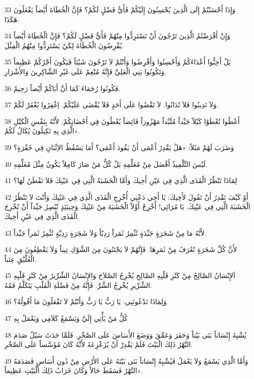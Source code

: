 \par 33 وَإِذَا أَحْسَنْتُمْ إِلَى الَّذِينَ يُحْسِنُونَ إِلَيْكُمْ فَأَيُّ فَضْلٍ لَكُمْ؟ فَإِنَّ الْخُطَاةَ أَيْضاً يَفْعَلُونَ هَكَذَا.
\par 34 وَإِنْ أَقْرَضْتُمُ الَّذِينَ تَرْجُونَ أَنْ تَسْتَرِدُّوا مِنْهُمْ فَأَيُّ فَضْلٍ لَكُمْ؟ فَإِنَّ الْخُطَاةَ أَيْضاً يُقْرِضُونَ الْخُطَاةَ لِكَيْ يَسْتَرِدُّوا مِنْهُمُ الْمِثْلَ.
\par 35 بَلْ أَحِبُّوا أَعْدَاءَكُمْ وَأَحْسِنُوا وَأَقْرِضُوا وَأَنْتُمْ لاَ تَرْجُونَ شَيْئاً فَيَكُونَ أَجْرُكُمْ عَظِيماً وَتَكُونُوا بَنِي الْعَلِيِّ فَإِنَّهُ مُنْعِمٌ عَلَى غَيْرِ الشَّاكِرِينَ وَالأَشْرَارِ.
\par 36 فَكُونُوا رُحَمَاءَ كَمَا أَنَّ أَبَاكُمْ أَيْضاً رَحِيمٌ.
\par 37 وَلاَ تَدِينُوا فَلاَ تُدَانُوا. لاَ تَقْضُوا عَلَى أَحَدٍ فَلاَ يُقْضَى عَلَيْكُمْ. اِغْفِرُوا يُغْفَرْ لَكُمْ.
\par 38 أَعْطُوا تُعْطَوْا كَيْلاً جَيِّداً مُلَبَّداً مَهْزُوزاً فَائِضاً يُعْطُونَ فِي أَحْضَانِكُمْ. لأَنَّهُ بِنَفْسِ الْكَيْلِ الَّذِي بِهِ تَكِيلُونَ يُكَالُ لَكُمْ».
\par 39 وَضَرَبَ لَهُمْ مَثَلاً: «هَلْ يَقْدِرُ أَعْمَى أَنْ يَقُودَ أَعْمَى؟ أَمَا يَسْقُطُ الاِثْنَانِ فِي حُفْرَةٍ؟
\par 40 لَيْسَ التِّلْمِيذُ أَفْضَلَ مِنْ مُعَلِّمِهِ بَلْ كُلُّ مَنْ صَارَ كَامِلاً يَكُونُ مِثْلَ مُعَلِّمِهِ.
\par 41 لِمَاذَا تَنْظُرُ الْقَذَى الَّذِي فِي عَيْنِ أَخِيكَ وَأَمَّا الْخَشَبَةُ الَّتِي فِي عَيْنِكَ فَلاَ تَفْطَنُ لَهَا؟
\par 42 أَوْ كَيْفَ تَقْدِرُ أَنْ تَقُولَ لأَخِيكَ: يَا أَخِي دَعْنِي أُخْرِجِ الْقَذَى الَّذِي فِي عَيْنِكَ وَأَنْتَ لاَ تَنْظُرُ الْخَشَبَةَ الَّتِي فِي عَيْنِكَ. يَا مُرَائِي! أَخْرِجْ أَوَّلاً الْخَشَبَةَ مِنْ عَيْنِكَ وَحِينَئِذٍ تُبْصِرُ جَيِّداً أَنْ تُخْرِجَ الْقَذَى الَّذِي فِي عَيْنِ أَخِيكَ.
\par 43 لأَنَّهُ مَا مِنْ شَجَرَةٍ جَيِّدَةٍ تُثْمِرُ ثَمَراً رَدِيّاً وَلاَ شَجَرَةٍ رَدِيَّةٍ تُثْمِرُ ثَمَراً جَيِّداً.
\par 44 لأَنَّ كُلَّ شَجَرَةٍ تُعْرَفُ مِنْ ثَمَرِهَا. فَإِنَّهُمْ لاَ يَجْتَنُونَ مِنَ الشَّوْكِ تِيناً وَلاَ يَقْطِفُونَ مِنَ الْعُلَّيْقِ عِنَباً.
\par 45 اَلإِنْسَانُ الصَّالِحُ مِنْ كَنْزِ قَلْبِهِ الصَّالِحِ يُخْرِجُ الصَّلاَحَ وَالإِنْسَانُ الشِّرِّيرُ مِنْ كَنْزِ قَلْبِهِ الشِّرِّيرِ يُخْرِجُ الشَّرَّ. فَإِنَّهُ مِنْ فَضْلَةِ الْقَلْبِ يَتَكَلَّمُ فَمُهُ.
\par 46 وَلِمَاذَا تَدْعُونَنِي: يَا رَبُّ يَا رَبُّ وَأَنْتُمْ لاَ تَفْعَلُونَ مَا أَقُولُهُ؟
\par 47 كُلُّ مَنْ يَأْتِي إِلَيَّ وَيَسْمَعُ كَلاَمِي وَيَعْمَلُ بِهِ
\par 48 يُشْبِهُ إِنْسَاناً بَنَى بَيْتاً وَحَفَرَ وَعَمَّقَ وَوَضَعَ الأَسَاسَ عَلَى الصَّخْرِ. فَلَمَّا حَدَثَ سَيْلٌ صَدَمَ النَّهْرُ ذَلِكَ الْبَيْتَ فَلَمْ يَقْدِرْ أَنْ يُزَعْزِعَهُ لأَنَّهُ كَانَ مُؤَسَّساً عَلَى الصَّخْرِ.
\par 49 وَأَمَّا الَّذِي يَسْمَعُ وَلاَ يَعْمَلُ فَيُشْبِهُ إِنْسَاناً بَنَى بَيْتَهُ عَلَى الأَرْضِ مِنْ دُونِ أَسَاسٍ فَصَدَمَهُ النَّهْرُ فَسَقَطَ حَالاً وَكَانَ خَرَابُ ذَلِكَ الْبَيْتِ عَظِيماً».

